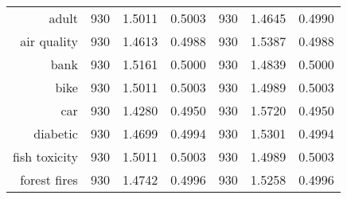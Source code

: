 \begin{table}[htbp]
{\begin{tabular}{rcccccc}
			adult                              & 930                                             & 1.5011                                                                             & 0.5003          & 930                               & \cellcolor[rgb]{ .776,  .937,  .808}\textcolor[rgb]{ 0,  .38,  0}{1.4645} & 0.4990          \\
			air quality                        & 930                                             & \cellcolor[rgb]{ .776,  .937,  .808}\textcolor[rgb]{ 0,  .38,  0}{1.4613}          & 0.4988          & 930                               & 1.5387                                                                    & 0.4988          \\
			bank                               & 930                                             & 1.5161                                                                             & 0.5000          & 930                               & \cellcolor[rgb]{ .776,  .937,  .808}\textcolor[rgb]{ 0,  .38,  0}{1.4839} & 0.5000          \\
			bike                               & 930                                             & 1.5011                                                                             & 0.5003          & 930                               & \cellcolor[rgb]{ .776,  .937,  .808}\textcolor[rgb]{ 0,  .38,  0}{1.4989} & 0.5003          \\
			car                                & 930                                             & \cellcolor[rgb]{ .776,  .937,  .808}\textcolor[rgb]{ 0,  .38,  0}{1.4280}          & 0.4950          & 930                               & 1.5720                                                                    & 0.4950          \\
			diabetic                           & 930                                             & \cellcolor[rgb]{ .776,  .937,  .808}\textcolor[rgb]{ 0,  .38,  0}{1.4699}          & 0.4994          & 930                               & 1.5301                                                                    & 0.4994          \\
			fish toxicity                      & 930                                             & 1.5011                                                                             & 0.5003          & 930                               & \cellcolor[rgb]{ .776,  .937,  .808}\textcolor[rgb]{ 0,  .38,  0}{1.4989} & 0.5003          \\
			forest fires                       & 930                                             & \cellcolor[rgb]{ .776,  .937,  .808}\textcolor[rgb]{ 0,  .38,  0}{1.4742}          & 0.4996          & 930                               & 1.5258                                                                    & 0.4996          \\

\end{tabular}}
\end{table}
